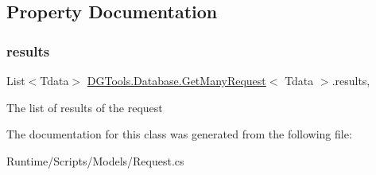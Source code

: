 \subsection{Property Documentation}
\mbox{\label{class_d_g_tools_1_1_database_1_1_get_many_request_a325bb1ce74fcf52a3a80026f2789c14a}} 
\subsubsection{\texorpdfstring{results}{results}}
{\footnotesize\ttfamily List$<$Tdata$>$ \mbox{\hyperlink{class_d_g_tools_1_1_database_1_1_get_many_request}{D\+G\+Tools.\+Database.\+Get\+Many\+Request}}$<$ Tdata $>$.results\hspace{0.3cm}{\ttfamily [get]}, {}}



The list of results of the request 



The documentation for this class was generated from the following file\+:\begin{DoxyCompactItemize}
\item 
Runtime/\+Scripts/\+Models/Request.\+cs\end{DoxyCompactItemize}
